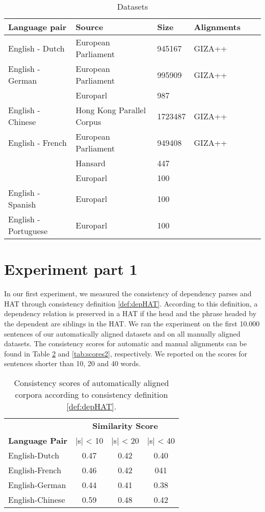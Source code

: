 \begin{table}[!ht]
\centering
\begin{tabular}{|l|l|l|l|l|l|}
\hline
\bf Language pair & \bf Source & \bf Size & \bf Alignments\\
\hline \hline
English - Dutch & European Parliament & 945167 & {\small GIZA++} \\
\hline
English - German & European Parliament & 995909 & {\small GIZA++} \\
& Europarl & 987 & {\small\cite{pado2006optimal}}\\
\hline
English - Chinese & Hong Kong Parallel Corpus & 1723487 & {\small GIZA++} \\
\hline
English - French & European Parliament & 949408 & {\small GIZA++} \\
& Hansard & 447 & {\small \cite{och2000improved}}\\
& Europarl & 100 & {\small \cite{graca2008building}} \\
\hline
English - Spanish & Europarl & 100 & {\small \cite{graca2008building}} \\
\hline
English - Portuguese & Europarl & 100 & {\small \cite{graca2008building}}\\
\hline
\end{tabular}
\caption{Datasets}\label{tab:datasets}
\end{table}

\section{Experiment part 1}
\label{sec:exp1}

In our first experiment, we measured the consistency of dependency parses and HAT through consistency definition \ref{def:depHAT}. According to this definition, a dependency relation is preserved in a HAT if the head and the phrase headed by the dependent are siblings in the HAT. We ran the experiment on the first 10.000 sentences of our automatically aligned datasets and on all manually aligned datasets. The consistency scores for automatic and manual alignments can be found in Table \ref{tab:scores1} and \ref{tab:scores2}, respectively. We reported on the scores for sentences shorter than 10, 20 and 40 words.

\begin{table}[!ht]
\centering
\begin{tabular}{|l|c|c|c|}
\hline
&\multicolumn{3}{c|}{\textbf{Similarity Score}}\\
\textbf{Language Pair} & |s| < 10 & |s| < 20 & |s| < 40\\
\hline \hline
English-Dutch & 0.47 & 0.42 & 0.40 \\
\hline
English-French & 0.46 & 0.42 & 041 \\
\hline
English-German & 0.44 & 0.41 & 0.38 \\
\hline
English-Chinese & 0.59 & 0.48 & 0.42\\
\hline
\end{tabular}
\caption{Consistency scores of automatically aligned corpora according to consistency definition \ref{def:depHAT}.}\label{tab:scores1}
\end{table}

